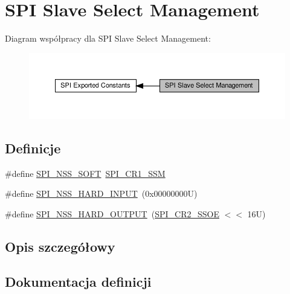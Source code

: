 \hypertarget{group___s_p_i___slave___select__management}{}\section{S\+PI Slave Select Management}
\label{group___s_p_i___slave___select__management}
Diagram współpracy dla S\+PI Slave Select Management\+:\nopagebreak
\begin{figure}[H]
\begin{center}
\leavevmode
\includegraphics[width=350pt]{group___s_p_i___slave___select__management}
\end{center}
\end{figure}
\subsection*{Definicje}
\begin{DoxyCompactItemize}
\item 
\#define \hyperlink{group___s_p_i___slave___select__management_ga0bf14691b9d03eb158f190cefa7ab8fc}{S\+P\+I\+\_\+\+N\+S\+S\+\_\+\+S\+O\+FT}~\hyperlink{group___peripheral___registers___bits___definition_ga0e236047e05106cf1ba7929766311382}{S\+P\+I\+\_\+\+C\+R1\+\_\+\+S\+SM}
\item 
\#define \hyperlink{group___s_p_i___slave___select__management_ga62c42a5e28ce3b0dc92c5186c10accf8}{S\+P\+I\+\_\+\+N\+S\+S\+\_\+\+H\+A\+R\+D\+\_\+\+I\+N\+P\+UT}~(0x00000000\+U)
\item 
\#define \hyperlink{group___s_p_i___slave___select__management_gab7f2da432661406a37fa2afe4efacd87}{S\+P\+I\+\_\+\+N\+S\+S\+\_\+\+H\+A\+R\+D\+\_\+\+O\+U\+T\+P\+UT}~(\hyperlink{group___peripheral___registers___bits___definition_gae94612b95395eff626f5f3d7d28352dd}{S\+P\+I\+\_\+\+C\+R2\+\_\+\+S\+S\+OE} $<$$<$ 16\+U)
\end{DoxyCompactItemize}


\subsection{Opis szczegółowy}


\subsection{Dokumentacja definicji}
\mbox{\label{group___s_p_i___slave___select__management_ga62c42a5e28ce3b0dc92c5186c10accf8}} 
